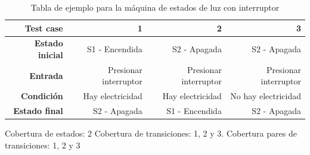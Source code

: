 \begin{table}[htbp]
   \centering
   \setlength{\tabcolsep}{10pt} %
   \renewcommand{\arraystretch}{1.5} %
   \begin{tabular}{|r|r|r|r|}
      \hline
      Test case&     1        &     2                    &     3  \\ \hline
      \textbf{Estado inicial} & S1 - Encendida           & S2 - Apagada          & S2 - Apagada \\ \hline
      \textbf{Entrada}        & Presionar interruptor    & Presionar interruptor & Presionar interruptor \\ \hline
      \textbf{Condición}      & Hay electricidad         & Hay electricidad   & No hay electricidad \\ \hline
      \textbf{Estado final}   & S2 - Apagada             & S1 - Encendida        & S2 - Apagada  \\ \hline
      \end{tabular}
   \caption{Tabla de ejemplo para la máquina de estados de luz con interruptor}
   \label{tab:05/maquinaEstado}
\end{table}

Cobertura de estados: 2
Cobertura de transiciones: 1, 2 y 3.
Cobertura pares de transiciones: 1, 2 y 3